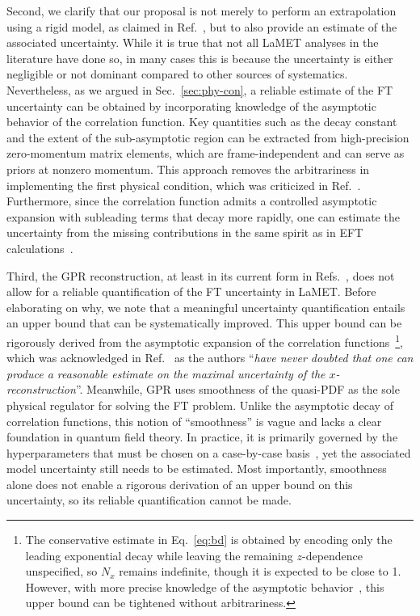 \documentclass[prd,twocolumn,superscriptaddress,preprintnumbers,showpacs,nofootinbib,notitlepage,floatfix]{revtex4-2}
\DeclareRobustCommand{\eq}[1]{Eq.~\eqref{eq:#1}}
\DeclareRobustCommand{\sec}[1]{Sec.~\ref{sec:#1}}
\DeclareRobustCommand{\eq}[1]{Eq.~(\ref{eq:#1})}
\begin{document}
Second, we clarify that our proposal is not merely to perform an extrapolation using a rigid model, as claimed in Ref.~\cite{Dutrieux:2025axb}, but to also provide an estimate of the associated uncertainty. While it is true that not all LaMET analyses in the literature have done so, in many cases this is because the uncertainty is either negligible or not dominant compared to other sources of systematics. Nevertheless, as we argued in \sec{phy-con}, a reliable estimate of the FT uncertainty can be obtained by incorporating knowledge of the asymptotic behavior of the correlation function. Key quantities such as the decay constant and the extent of the sub-asymptotic region can be extracted from high-precision zero-momentum matrix elements, which are frame-independent and can serve as priors at nonzero momentum. This approach removes the arbitrariness in implementing the first physical condition, which was criticized in Ref.~\cite{Dutrieux:2025axb}. Furthermore, since the correlation function admits a controlled asymptotic expansion with subleading terms that decay more rapidly, one can estimate the uncertainty from the missing contributions in the same spirit as in EFT calculations~\cite{Ji:2026vir}.

Third, the GPR reconstruction, at least in its current form in Refs.~\cite{Dutrieux:2024rem,Dutrieux:2025jed,Dutrieux:2025axb}, does not allow for a reliable quantification of the FT uncertainty in LaMET. Before elaborating on why, we note that a meaningful uncertainty quantification entails an upper bound that can be systematically improved. This upper bound can be rigorously derived from the asymptotic expansion of the correlation functions~\footnote{The conservative estimate in \eq{bd} is obtained by encoding only the leading exponential decay while leaving the remaining $z$-dependence unspecified, so $N_x$ remains indefinite, though it is expected to be close to 1. However, with more precise knowledge of the asymptotic behavior~\cite{Ji:2026vir}, this upper bound can be tightened without arbitrariness.}, which was acknowledged in Ref.~\cite{Dutrieux:2025axb} as the authors ``\textit{have never doubted that one can produce a reasonable estimate on the maximal uncertainty of the $x$-reconstruction}''. Meanwhile, GPR uses smoothness of the quasi-PDF as the sole physical regulator for solving the FT problem. Unlike the asymptotic decay of correlation functions, this notion of ``smoothness'' is vague and lacks a clear foundation in quantum field theory. In practice, it is primarily governed by the hyperparameters that must be chosen on a case-by-case basis~\cite{Dutrieux:2025axb}, yet the associated model uncertainty still needs to be estimated. Most importantly, smoothness alone does not enable a rigorous derivation of an upper bound on this uncertainty, so its reliable quantification cannot be made.
\end{document}
